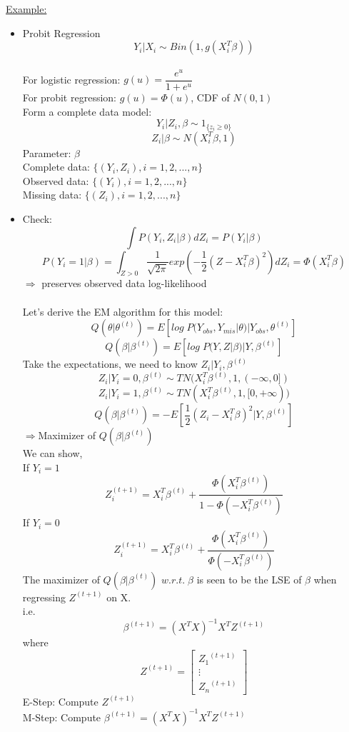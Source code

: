 \documentclass[12pt]{article}
\begin{document}
\underline {Example:} 
\begin{itemize}
\item Probit Regression
$$Y_i|X_i \sim Bin(1, g(X_i^T\beta))$$ \\
For logistic regression: $g(u)=\dfrac{e^u}{1+e^u}$\\
For probit regression:  $g(u)=\Phi(u)$, CDF of $N(0, 1)$\\
Form a complete data model:\\
$$Y_i|Z_i, \beta \sim 1_{\{z_i\geqslant 0\}}$$
$$Z_i| \beta \sim N(X_i^T\beta, 1)$$
Parameter: $\beta$\\
Complete data: $\{(Y_i, Z_i), i=1, 2, ..., n\}$\\
Observed data: $\{(Y_i), i=1, 2, ..., n\}$\\
Missing data: $\{(Z_i), i=1, 2, ..., n\}$\\
\item Check:
$$\int P(Y_i, Z_i|\beta)dZ_i=P(Y_i|\beta)$$
$$P(Y_i=1|\beta)=\int_{Z>0}\dfrac{1}{\sqrt{2\pi}}exp(-\frac{1}{2}(Z-X_i^T\beta)^2)dZ_i=\Phi(X_i^T\beta)$$
$\Rightarrow$ preserves observed data log-likelihood\\\\
Let's derive the EM algorithm for this model:\\ 
$$Q(\theta|\theta^{(t)})=E[log\;P(Y_{obs}, Y_{mis}|\theta)|Y_{obs}, \theta^{(t)}]$$
$$Q(\beta|\beta^{(t)})=E[log\;P(Y, Z|\beta)|Y, \beta^{(t)}]$$
Take the expectations, we need to know $Z_i|Y_i,\beta^{(t)}$\\
$$Z_i|Y_i=0,\beta^{(t)}\sim TN(X_i^T\beta^{(t)}, 1, (-\infty, 0])$$
$$Z_i|Y_i=1,\beta^{(t)}\sim TN(X_i^T\beta^{(t)}, 1, [0, +\infty))$$
$$Q(\beta|\beta^{(t)})=-E[\frac{1}{2}(Z_i-X_i^T\beta)^2|Y, \beta^{(t)}]$$
$\Rightarrow $Maximizer of $Q(\beta|\beta^{(t)})$\\
We can show,\\
If $Y_i=1$
$$Z_i^{(t+1)}=X_i^T\beta^{(t)}+\dfrac{\Phi(X_i^T\beta^{(t)})}{1-\Phi(-X_i^T\beta^{(t)})}$$
If $Y_i=0$
$$Z_i^{(t+1)}=X_i^T\beta^{(t)}+\dfrac{\Phi(X_i^T\beta^{(t)})}{\Phi(-X_i^T\beta^{(t)})}$$
The maximizer of $Q(\beta|\beta^{(t)})$ $w.r.t.\; \beta$ is seen to be the LSE of $\beta$ when regressing $Z^{(t+1)}$ on X.\\
i.e.
$$\beta^{(t+1)}=(X^TX)^{-1}X^TZ^{(t+1)}$$
where
$$Z^{(t+1)}=[\begin{array} {cccc} {Z_1}^{(t+1)}\\\vdots\\{Z_n}^{(t+1)} \end{array}]$$
E-Step: Compute $Z^{(t+1)}$\\
M-Step: Compute $\beta^{(t+1)}=(X^TX)^{-1}X^TZ^{(t+1)}$\\
\end{itemize}
\end{document}
